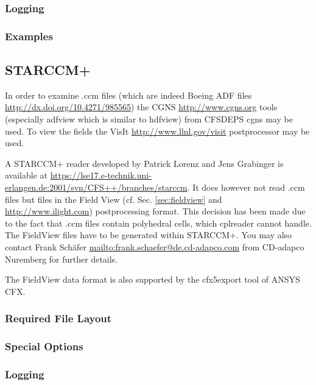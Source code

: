\documentclass[a4paper,10pt]{article}
\begin{document}
\subsubsection{Logging} 

\subsubsection{Examples}


\newpage
\subsection{STARCCM+}
\label{sec:starccm}

In  order  to   examine  .ccm  files  (which  are   indeed  Boeing  ADF  files
\url{http://dx.doi.org/10.4271/985565})   the  CGNS  \url{http://www.cgns.org}
tools (especially adfview  which is similar to hdfview)  from CFSDEPS cgns may
be  used.   To  view  the  fields  the  VisIt  \url{http://www.llnl.gov/visit}
postprocessor may be used.

A STARCCM+ reader developed by  Patrick Lorenz and Jens Grabinger is available
at
\url{https://lse17.e-technik.uni-erlangen.de:2001/svn/CFS++/branches/starccm}.
It  does   however  not  read  .ccm   files  but  files  in   the  Field  View
(cf. Sec.  \ref{sec:fieldview} and \url{http://www.ilight.com}) postprocessing
format.  This decision  has been made due to the fact  that .ccm files contain
polyhedral cells, which  cplreader cannot handle. The FieldView  files have to
be   generated  within   STARCCM+.  You   may  also   contact   Frank  Schäfer
\url{mailto:frank.schaefer@de.cd-adapco.com}  from   CD-adapco  Nuremberg  for
further details.

The FieldView  data format is also  supported by the cfx5export  tool of ANSYS
CFX.

\subsubsection{Required File Layout}

\subsubsection{Special Options}

\subsubsection{Logging} 
\end{document}
